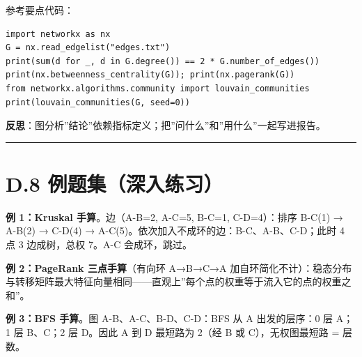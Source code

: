 参考要点代码：

\begin{verbatim}
import networkx as nx
G = nx.read_edgelist("edges.txt")
print(sum(d for _, d in G.degree()) == 2 * G.number_of_edges())
print(nx.betweenness_centrality(G)); print(nx.pagerank(G))
from networkx.algorithms.community import louvain_communities
print(louvain_communities(G, seed=0))
\end{verbatim}

\textbf{反思}：图分析''结论''依赖指标定义；把''问什么''和''用什么''一起写进报告。

\begin{center}\rule{0.5\linewidth}{0.5pt}\end{center}

\section{D.8
例题集（深入练习）}\label{d.8-ux4f8bux9898ux96c6ux6df1ux5165ux7ec3ux4e60}

\textbf{例 1：Kruskal 手算}。边（A-B=2, A-C=5, B-C=1, C-D=4）：排序
B-C(1) → A-B(2) → C-D(4) →
A-C(5)。依次加入不成环的边：B-C、A-B、C-D；此时 4 点 3 边成树，总权
7。A-C 会成环，跳过。

\textbf{例 2：PageRank 三点手算}（有向环 A→B→C→A
加自环简化不计）：稳态分布与转移矩阵最大特征向量相同------直观上''每个点的权重等于流入它的点的权重之和''。

\textbf{例 3：BFS 手算}。图 A-B、A-C、B-D、C-D：BFS 从 A 出发的层序：0
层 A；1 层 B、C；2 层 D。因此 A 到 D 最短路为 2（经 B 或
C），无权图最短路 = 层数。
